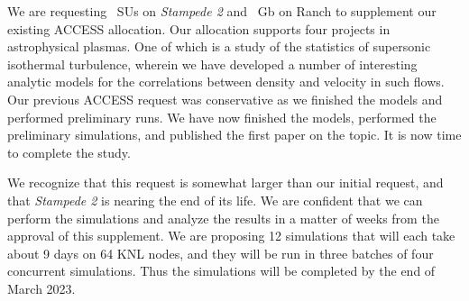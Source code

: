 
We are requesting  \request\ SUs  on \emph{Stampede 2} and
\requestdisk\ Gb on Ranch to supplement our existing ACCESS allocation.
Our allocation supports four projects in astrophysical plasmas. One of which is
a study of the statistics of supersonic isothermal turbulence, wherein we have developed a number
of interesting analytic models for the correlations between density and
velocity in such flows.  Our previous
ACCESS request was conservative as we finished the models and performed
preliminary runs.  We have now finished
the models, performed the
preliminary
simulations, and published the first paper on the topic.  It is now time to complete the study.

We recognize that this request is somewhat larger than our initial request, and
that \emph{Stampede 2} is nearing the end of its life.   We are confident that
we can perform the simulations and analyze the results in a matter of weeks from
the approval of this supplement.   We are proposing 12 simulations that will
each take about 9 days on 64 KNL nodes, and they will be run in three batches of
four concurrent simulations.  Thus the simulations will be completed by the end
of March 2023. 

